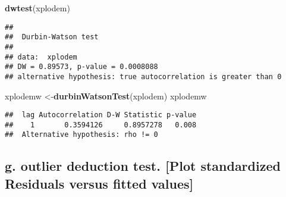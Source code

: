 \documentclass[
]{article}
\newenvironment{Shaded}{\begin{snugshade}}{\end{snugshade}}
\newcommand{\FunctionTok}[1]{\textcolor[rgb]{0.13,0.29,0.53}{\textbf{#1}}}
\newcommand{\NormalTok}[1]{#1}
\newcommand{\OtherTok}[1]{\textcolor[rgb]{0.56,0.35,0.01}{#1}}
\begin{document}
\begin{Shaded}
\begin{Highlighting}[]
\FunctionTok{dwtest}\NormalTok{(xplodem)}
\end{Highlighting}
\end{Shaded}

\begin{verbatim}
## 
##  Durbin-Watson test
## 
## data:  xplodem
## DW = 0.89573, p-value = 0.0008088
## alternative hypothesis: true autocorrelation is greater than 0
\end{verbatim}

\begin{Shaded}
\begin{Highlighting}[]
\NormalTok{xplodemw }\OtherTok{\textless{}{-}}\FunctionTok{durbinWatsonTest}\NormalTok{(xplodem)}
\NormalTok{xplodemw}
\end{Highlighting}
\end{Shaded}

\begin{verbatim}
##  lag Autocorrelation D-W Statistic p-value
##    1       0.3594126     0.8957278   0.008
##  Alternative hypothesis: rho != 0
\end{verbatim}

\hypertarget{g.-outlier-deduction-test.-plot-standardized-residuals-versus-fitted-values}{%
\subsection{g. outlier deduction test. {[}Plot standardized Residuals
versus fitted
values{]}}\label{g.-outlier-deduction-test.-plot-standardized-residuals-versus-fitted-values}}
\end{document}
